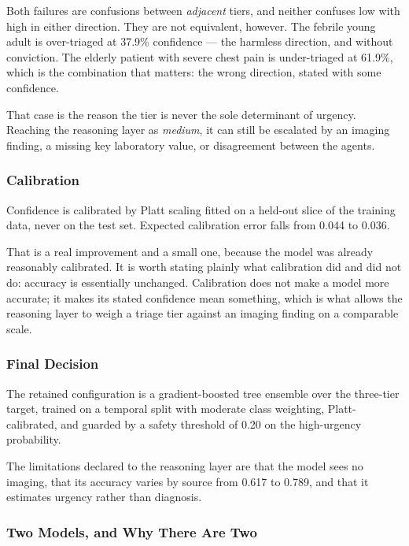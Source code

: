 Both failures are confusions between \emph{adjacent} tiers, and neither confuses low with high
in either direction. They are not equivalent, however. The febrile young adult is over-triaged
at 37.9\% confidence --- the harmless direction, and without conviction. The elderly patient
with severe chest pain is under-triaged at 61.9\%, which is the combination that matters: the
wrong direction, stated with some confidence.

That case is the reason the tier is never the sole determinant of urgency. Reaching the
reasoning layer as \emph{medium}, it can still be escalated by an imaging finding, a missing key
laboratory value, or disagreement between the agents.

\subsubsection{Calibration}

Confidence is calibrated by Platt scaling fitted on a held-out slice of the training data,
never on the test set. Expected calibration error falls from 0.044 to 0.036.

That is a real improvement and a small one, because the model was already reasonably
calibrated. It is worth stating plainly what calibration did and did not do: accuracy is
essentially unchanged. Calibration does not make a model more accurate; it makes its stated
confidence mean something, which is what allows the reasoning layer to weigh a triage tier
against an imaging finding on a comparable scale.

\subsubsection{Final Decision}

The retained configuration is a gradient-boosted tree ensemble over the three-tier target,
trained on a temporal split with moderate class weighting, Platt-calibrated, and guarded by a
safety threshold of 0.20 on the high-urgency probability.

The limitations declared to the reasoning layer are that the model sees no imaging, that its
accuracy varies by source from 0.617 to 0.789, and that it estimates urgency rather than
diagnosis.

\subsubsection{Two Models, and Why There Are Two}
\label{subsec:triage-deployment}

